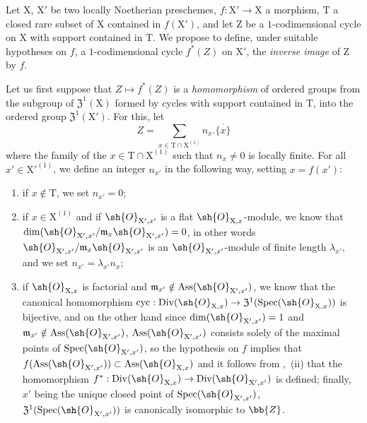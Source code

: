 \begin{env}[21.10.1]
\label{IV.21.10.1}
Let $\mathrm{X}$, $\mathrm{X}'$ be two locally Noetherian preschemes, $f:\mathrm{X}'\to\mathrm{X}$ a morphism, $\mathrm{T}$ a closed rare subset of $\mathrm{X}$ contained in $f(\mathrm{X}')$, and let $\mathrm{Z}$ be a $1$-codimensional cycle on $\mathrm{X}$ with support contained in $\mathrm{T}$.
We propose to define, under suitable hypotheses on $f$, a $1$-codimensional cycle $f^*(Z)$ on $\mathrm{X}'$, the \emph{inverse image} of $\mathrm{Z}$ by $f$.

Let us first suppose that $Z\mapsto f^*(Z)$ is a \emph{homomorphism} of ordered groups from the subgroup of $\mathfrak{Z}^1(\mathrm{X})$ formed by cycles with support contained in $\mathrm{T}$, into the ordered group $\mathfrak{Z}^1(\mathrm{X}')$.
For this, let
\[
\label{IV.21.10.1.1}
  Z = \sum_{x\in\mathrm{T}\cap\mathrm{X}^{(1)}} n_x.\overline{\{x\}}
  \tag{21.10.1.1}
\]
where the family of the $x\in\mathrm{T}\cap\mathrm{X}^{(1)}$ such that $n_x\neq 0$ is locally finite.
For all $x'\in\mathrm{X}'^{(1)}$, we define an integer $n_{x'}$ in the following way, setting $x=f(x')$:
\begin{enumerate}[label=\arabic*\textsuperscript{o}]
  \item if $x\notin\mathrm{T}$, we set $n_{x'}=0$;
  \item if $x\in\mathrm{X}^{(1)}$ and if $\sh{O}_{\mathrm{X}',x'}$ is a flat $\sh{O}_{\mathrm{X},x}$-module, we know  that $\dim(\sh{O}_{\mathrm{X}',x'}/\mathfrak{m}_x\sh{O}_{\mathrm{X}',x'})=0$, in other words $\sh{O}_{\mathrm{X}',x'}/\mathfrak{m}_x\sh{O}_{\mathrm{X}',x'}$ is an $\sh{O}_{\mathrm{X}',x'}$-module of finite length $\lambda_{x'}$, and we set $n_{x'}=\lambda_{x'}n_x$;
  \item if $\sh{O}_{\mathrm{X},x}$ is factorial and $\mathfrak{m}_{x'}\notin\operatorname{Ass}(\sh{O}_{\mathrm{X}',x'})$, we know  that the canonical homomorphism $\operatorname{cyc}:\operatorname{Div}(\sh{O}_{\mathrm{X},x})\to\mathfrak{Z}^1(\operatorname{Spec}(\sh{O}_{\mathrm{X},x}))$ is bijective, and on the other hand since $\dim(\sh{O}_{\mathrm{X}',x'})=1$ and $\mathfrak{m}_{x'}\notin\operatorname{Ass}(\sh{O}_{\mathrm{X}',x'})$, $\operatorname{Ass}(\sh{O}_{\mathrm{X}',x'})$ consists solely of the maximal points of $\operatorname{Spec}(\sh{O}_{\mathrm{X}',x'})$, so the hypothesis on $f$ implies that $f(\operatorname{Ass}(\sh{O}_{\mathrm{X}',x'}))\subset\operatorname{Ass}(\sh{O}_{\mathrm{X},x})$ and it follows from ,~(ii) that the homomorphism $f^*:\operatorname{Div}(\sh{O}_{\mathrm{X},x})\to\operatorname{Div}(\sh{O}_{\mathrm{X}',x'})$ is defined; finally, $x'$ being the unique closed point of $\operatorname{Spec}(\sh{O}_{\mathrm{X}',x'})$, $\mathfrak{Z}^1(\operatorname{Spec}(\sh{O}_{\mathrm{X}',x'}))$ is canonically isomorphic to $\bb{Z}$.

\end{enumerate}
\end{env}
